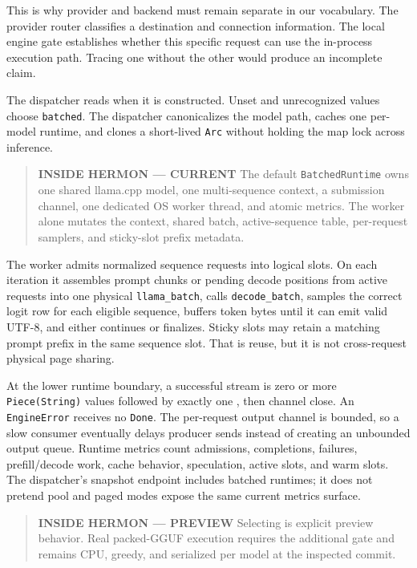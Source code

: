\documentclass[
  10pt,
]{article}
\begin{document}
This is why provider and backend must remain separate in our vocabulary.
The provider router classifies a destination and connection information.
The local engine gate establishes whether this specific request can use
the in-process execution path. Tracing one without the other would
produce an incomplete claim.

The dispatcher reads \texttt{} when it
is constructed. Unset and unrecognized values choose \texttt{batched}.
The dispatcher canonicalizes the model path, caches one per-model
runtime, and clones a short-lived \texttt{Arc} without holding the map
lock across inference.

\begin{quote}
\textbf{INSIDE HERMON --- CURRENT} The default \texttt{BatchedRuntime}
owns one shared llama.cpp model, one multi-sequence context, a
submission channel, one dedicated OS worker thread, and atomic metrics.
The worker alone mutates the context, shared batch, active-sequence
table, per-request samplers, and sticky-slot prefix metadata.
\end{quote}

The worker admits normalized sequence requests into logical slots. On
each iteration it assembles prompt chunks or pending decode positions
from active requests into one physical \texttt{llama\_batch}, calls
\texttt{decode\_batch}, samples the correct logit row for each eligible
sequence, buffers token bytes until it can emit valid UTF-8, and either
continues or finalizes. Sticky slots may retain a matching prompt prefix
in the same sequence slot. That is reuse, but it is not cross-request
physical page sharing.

At the lower runtime boundary, a successful stream is zero or more
\texttt{Piece(String)} values followed by exactly one
\texttt{}, then channel close. An
\texttt{EngineError} receives no \texttt{Done}. The per-request output
channel is bounded, so a slow consumer eventually delays producer sends
instead of creating an unbounded output queue. Runtime metrics count
admissions, completions, failures, prefill/decode work, cache behavior,
speculation, active slots, and warm slots. The dispatcher's snapshot
endpoint includes batched runtimes; it does not pretend pool and paged
modes expose the same current metrics surface.

\begin{quote}
\textbf{INSIDE HERMON --- PREVIEW} Selecting
\texttt{} is explicit preview
behavior. Real packed-GGUF execution requires the additional
\texttt{} gate and remains CPU, greedy,
and serialized per model at the inspected commit.
\end{quote}
\end{document}
